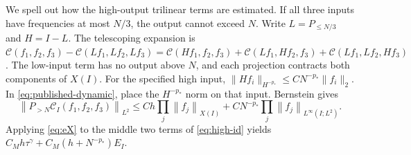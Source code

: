 \documentclass[11pt]{article}
\theoremstyle{remark}\newtheorem{remark}[theorem]{Remark}
\newcommand{\cC}{\mathcal C}
\newcommand{\norm}[2][]{\left\lVert #2\right\rVert_{#1}}
\begin{document}
We spell out how the high-output trilinear terms are estimated. If all three
inputs have frequencies at most $N/3$, the output cannot exceed $N$.
Write $L=P_{\leq N/3}$ and $H=I-L$. The telescoping expansion is
$\cC(f_1,f_2,f_3)-\cC(Lf_1,Lf_2,Lf_3)
=\cC(Hf_1,f_2,f_3)+\cC(Lf_1,Hf_2,f_3)
+\cC(Lf_1,Lf_2,Hf_3)$. The low-input term has no output above $N$,
and each projection contracts both components of $X(I)$. For the specified
high input, $\|Hf_i\|_{H^{-p_*}}\leq C N^{-p_*}\|f_i\|_2$. In \eqref{eq:published-dynamic}, place the
$H^{-p_*}$ norm on that input. Bernstein gives
\begin{equation}\label{eq:Chigh}
\norm[L^2]{P_{>N}\cC_I(f_1,f_2,f_3)}
\leq C h\prod_j\norm[X(I)]{f_j}
+C N^{-p_*}\prod_j\norm[L^\infty(I;L^2)]{f_j}.
\end{equation}
Applying \eqref{eq:eX} to the middle two terms of \eqref{eq:high-id} yields
$C_Mh\tau^\gamma+C_M(h+N^{-p_*})E_I$.
\end{document}
